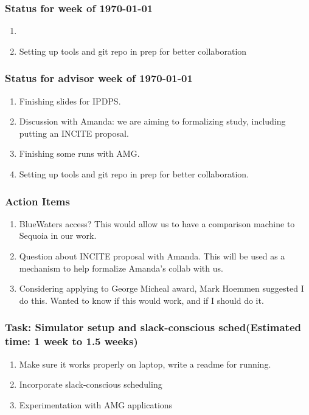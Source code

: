 \begin{frame} [Status] 
\frametitle{Status for week of \today}
\begin{enumerate} 
\item 
\item Setting up tools and git repo in prep for better collaboration
\end{enumerate}
\end{frame} 

\begin{frame} [Status] 
\frametitle{Status for advisor week of \today}
\begin{enumerate} 
\item Finishing slides for IPDPS. 
\item Discussion with Amanda: we are aiming to formalizing study, including putting an INCITE proposal. 
\item Finishing some runs with AMG. 
\item Setting up tools and git repo in prep for better collaboration. 
\end{enumerate}
\end{frame}  


\begin{frame}
\frametitle{Action Items}
\begin{enumerate}
\tiny \item \tiny  BlueWaters access?  This would allow us to have a comparison machine to Sequoia in our work. \\
\item \tiny Question about INCITE proposal with Amanda. This will be used as a mechanism to help formalize Amanda's collab with us.  \\
\item \tiny Considering applying to George Micheal award, Mark Hoemmen suggested I do this. 
 Wanted to know if this would work, and if I should do it.  \\
\end{enumerate}
\end{frame}  

\begin{frame} [Tasks] 
\frametitle{Task: Simulator setup and slack-conscious sched(Estimated time: 1 week to 1.5 weeks)}
\begin{enumerate} 
\item Make sure it works properly on laptop, write a readme for running. 
\item Incorporate slack-conscious scheduling
\item Experimentation with AMG applications 
\end{enumerate}
\end{frame}  

